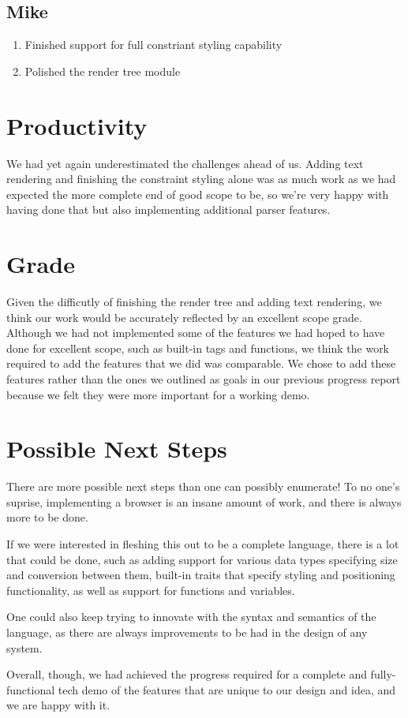 \documentclass{article}
\begin{document}
\subsection*{Mike}
\begin{enumerate}
	\item Finished support for full constriant styling capability
    \item Polished the render tree module
\end{enumerate}

\section*{Productivity}
We had yet again underestimated the challenges ahead of us. Adding text rendering and finishing the 
constraint styling alone was as much work as we had expected the more complete end of good scope to
be, so we're very happy with having done that but also implementing additional parser features.

\section*{Grade}

Given the difficutly of finishing the render tree and adding text rendering, we think our work would
be accurately reflected by an excellent scope grade. Although we had not implemented some of the 
features we had hoped to have done for excellent scope, such as built-in tags and functions, we think
the work required to add the features that we did was comparable. We chose to add these features
rather than the ones we outlined as goals in our previous progress report because we felt they were
more important for a working demo. 

\section*{Possible Next Steps}

There are more possible next steps than one can possibly enumerate! To no one's suprise, implementing
a browser is an insane amount of work, and there is always more to be done.

If we were interested in fleshing this out to be a complete language, there is a lot that could be
done, such as adding support for various data types specifying size and conversion between them,
built-in traits that specify styling and positioning functionality, as well as support for functions
and variables. 

One could also keep trying to innovate with the syntax and semantics of the language, as there are
always improvements to be had in the design of any system. 

Overall, though, we had achieved the progress required for a complete and fully-functional
tech demo of the features that are unique to our design and idea, and we are happy with it.
\end{document}
